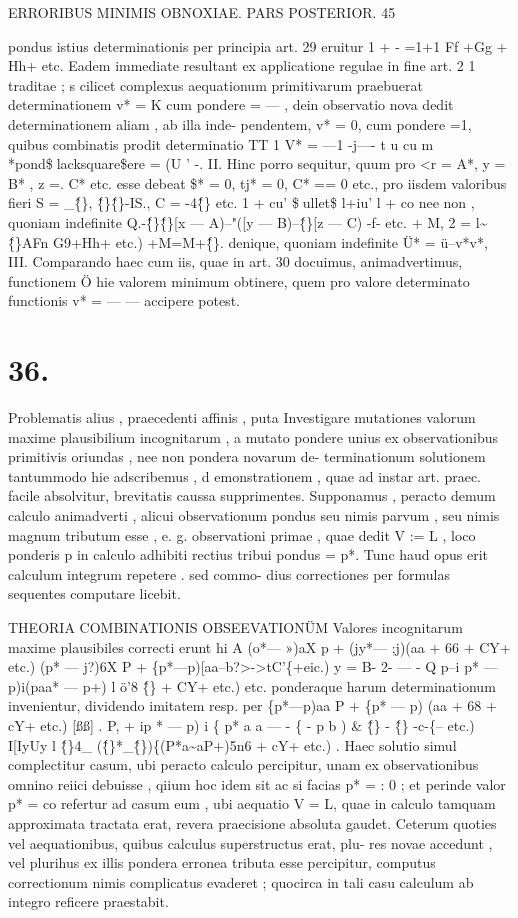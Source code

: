 \documentclass[12pt,a4paper]{article}
\begin{document}
\newpage
\begin{center}
\textsc{ERRORIBUS MINIMIS OBNOXIAE. PARS POSTERIOR. 45}
\end{center}
pondus istius determinationis per principia art. 29 eruitur
1 + - =1+1
Ff +Gg + Hh+ etc.
Eadem immediate resultant ex applicatione regulae in fine art. 2 1 traditae ; s cilicet
complexus aequationum primitivarum praebuerat determinationem v* = K cum
pondere = --- , dein observatio nova dedit determinationem aliam , ab illa inde-
pendentem, v* = 0, cum pondere =1, quibus combinatis prodit determinatio
TT 1
V* = ---1 -j---- t u cu m *pond\$lacksquare\$ere = (U ' -.
II. Hinc porro sequitur, quum pro <r = A*, y = B* , z =. C* etc. esse
debeat \$* = 0, tj* = 0, C* == 0 etc., pro iisdem valoribus fieri
S = \_\^\{\}, \^\{\}\^\{\}-IS., C = -4\^\{\} etc.
1 + cu' \$ullet\$ l+iu' l + co
nee non , quoniam indefinite Q.-\^\{\}\^\{\}[x --- A)--"([y --- B)--\^\{\}[z --- C) -f- etc. + M,
2 = l\~{}\^\{\}AFn G9+Hh+ etc.) +M=M+\^\{\}.
denique, quoniam indefinite Ü* = ü--v*v*,
III. Comparando haec cum iis, quae in art. 30 docuimus, animadvertimus,
functionem Ö hie valorem minimum obtinere, quem pro valore determinato
functionis v* = --- --- accipere potest.
\section*{\textbf{36.}}
Problematis alius , praecedenti affinis , puta
Investigare mutationes valorum maxime plausibilium incognitarum , a mutato
pondere unius ex observationibus primitivis oriundas , nee non pondera novarum de-
terminationum
solutionem tantummodo hie adscribemus , d emonstrationem , quae ad instar art.
praec. facile absolvitur, brevitatis caussa supprimentes.
Supponamus , peracto demum calculo animadverti , alicui observationum
pondus seu nimis parvum , seu nimis magnum tributum esse , e. g. observationi
primae , quae dedit V := L , loco ponderis p in calculo adhibiti rectius tribui
pondus = p*. Tunc haud opus erit calculum integrum repetere . sed commo-
dius correctiones per formulas sequentes computare licebit.

 THEORIA COMBINATIONIS OBSEEVATIONÜM
Valores incognitarum maxime plausibiles correcti erunt hi
A (o*--- »)aX
p + (jy*--- ;j)(aa + 66 + CY+ etc.)
(p* --- j?)6X
P + \{p*---p)[aa--b?>->tC'\{+eic.)
y = B-
2- --- - Q p--i p* --- p)i(paa* --- p+) l ö'8 \^\{\} + CY+ etc.)
etc. ponderaque harum determinationum invenientur, dividendo imitatem resp. per
\{p*---p)aa
P + \{p* --- p) (aa + 68 + cY+ etc.)
[ßß]
. P, + ip * --- p) i \{ p* a a --- - \{ - p b ) \& \^\{\} - \^\{\}  -c-\{-- etc.)
I[IyUy l \^\{\}4\_ (\^\{\}*\_\^\{\})\{(P*a\~{}aP+)5n6 + cY+ etc.) .
Haec solutio simul complectitur casum, ubi peracto calculo percipitur, unam ex
observationibus omnino reiici debuisse , qiium hoc idem sit ac si facias p* = : 0 ;
et perinde valor p* = co refertur ad casum eum , ubi aequatio V = L, quae
in calculo tamquam approximata tractata erat, revera praecisione absoluta gaudet.
Ceterum quoties vel aequationibus, quibus calculus superstructus erat, plu-
res novae accedunt , vel plurihus ex illis pondera erronea tributa esse percipitur,
computus correctionum nimis complicatus evaderet ; quocirca in tali casu calculum
ab integro reficere praestabit.
\end{document}
